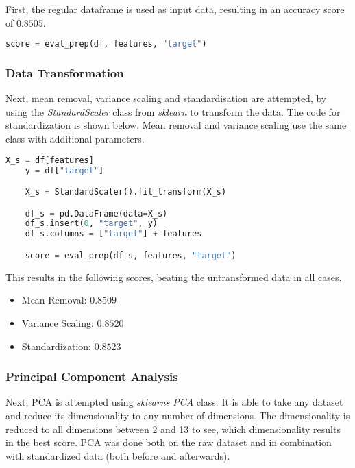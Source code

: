 First, the regular dataframe is used as input data, resulting in an accuracy score of $0.8505$.

\begin{lstlisting}[language=Python]
    score = eval_prep(df, features, "target")
\end{lstlisting}

\subsubsection{Data Transformation}

Next, mean removal, variance scaling and standardisation are attempted, by using the \emph{StandardScaler}
class from \emph{sklearn} to transform the data. The code for standardization is shown below.
Mean removal and variance scaling use the same class with additional parameters.

\begin{lstlisting}[language=Python]
    X_s = df[features]
    y = df["target"]

    X_s = StandardScaler().fit_transform(X_s)

    df_s = pd.DataFrame(data=X_s)
    df_s.insert(0, "target", y)
    df_s.columns = ["target"] + features

    score = eval_prep(df_s, features, "target")
\end{lstlisting}

This results in the following scores, beating the untransformed data in all cases.

\begin{itemize}
    \item Mean Removal: $0.8509$
    \item Variance Scaling: $0.8520$
    \item Standardization: $0.8523$
\end{itemize}

\subsubsection{Principal Component Analysis}

Next, \ac{PCA} is attempted using \emph{sklearns} \emph{PCA} class. It is able to take any dataset and reduce
its dimensionality to any number of dimensions. The dimensionality is reduced to all dimensions
between 2 and 13 to see, which dimensionality results in the best score.
\ac{PCA} was done both on the raw dataset and in combination with standardized data (both before and afterwards).

